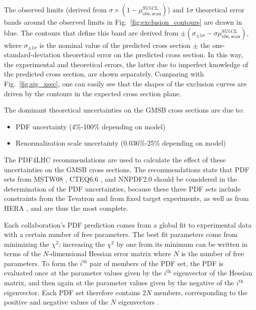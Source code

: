 \documentclass[dissertation.tex]{subfiles}
\begin{document}
The observed limits (derived from $\sigma\times(1 - \mu_{\mathrm{obs,scan}}^{95\%\mathrm{CL}})$) and $1\sigma$ theoretical error bands around the observed limits in Fig.~\ref{fig:exclusion_contours} are drawn in blue.  The contours that define this band are derived from $\pm(\sigma_{\pm1\sigma} - \sigma\mu_{\mathrm{obs,scan}}^{95\%\mathrm{CL}})$, where $\sigma_{\pm1\sigma}$ is the nominal value of the predicted cross section $\pm$ the one-standard-deviation theoretical error on the predicted cross section.  In this way, the experimental and theoretical errors, the latter due to imperfect knowledge of the predicted cross section, are shown separately.  Comparing with Fig.~\ref{fig:sig_xsec}, one can easily see that the shapes of the exclusion curves are driven by the contours in the expected cross section plane.

The dominant theoretical uncertainties on the GMSB cross sections are due to:

\begin{itemize}
\item PDF uncertainty (4\%-100\% depending on model)
\item Renormalization scale uncertainty (0.036\%-25\% depending on model)
\end{itemize}
%
The PDF4LHC \cite{PDF4LHC} recommendations are used to calculate the effect of these uncertainties on the GMSB cross sections.  The recommendations state that PDF sets from MSTW08 \cite{MSTW08}, CTEQ6.6 \cite{CTEQ6}, and NNPDF2.0 \cite{NNPDF2_0} should be considered in the determination of the PDF uncertainties, because these three PDF sets include constraints from the Tevatron and from fixed target experiments, as well as from HERA \cite{HERA}, and are thus the most complete.

Each collaboration's PDF prediction comes from a global fit to experimental data with a certain number of free parameters.  The best fit parameters come from minimizing the $\chi^{2}$; increasing the $\chi^{2}$ by one from its minimum can be written in terms of the $N$-dimensional Hessian error matrix \cite{Hessian} where $N$ is the number of free parameters.  To form the $i^{\mathrm{th}}$ pair of members of the PDF set, the PDF is evaluated once at the parameter values given by the $i^{\mathrm{th}}$ eigenvector of the Hessian matrix, and then again at the parameter values given by the negative of the $i^{\mathrm{th}}$ eigenvector.  Each PDF set therefore contains 2$N$ members, corresponding to the positive and negative values of the $N$ eigenvectors \cite{PDF_primer}.
\end{document}
